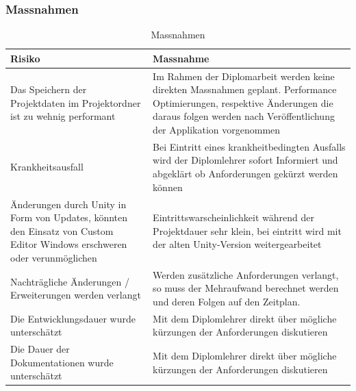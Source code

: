 \subsubsection{Massnahmen}
\begin{table}[H]
    \centering
    \settowidth{}
    \setlength\extrarowheight{2pt}
    \begin{tabulary}{1.0\textwidth}{|L|L|}
      \hline
      \textbf{Risiko} &
      \textbf{Massnahme}\\
      \hline
      Das Speichern der Projektdaten im Projektordner ist zu wehnig performant &
      Im Rahmen der Diplomarbeit werden keine direkten Massnahmen geplant.
      Performance Optimierungen, respektive Änderungen die daraus folgen werden nach Veröffentlichung der Applikation vorgenommen\\
      \hline
      Krankheitsausfall &
      Bei Eintritt eines krankheitbedingten Ausfalls wird der Diplomlehrer sofort Informiert und abgeklärt ob Anforderungen gekürzt werden können\\
      \hline
      Änderungen durch Unity in Form von Updates, könnten den Einsatz von Custom Editor Windows erschweren oder verunmöglichen &
      Eintrittswarscheinlichkeit während der Projektdauer sehr klein, bei eintritt wird mit der alten Unity-Version weitergearbeitet\\
      \hline
      Nachträgliche Änderungen / Erweiterungen werden verlangt &
      Werden zusätzliche Anforderungen verlangt, so muss der Mehraufwand berechnet werden und deren Folgen auf den Zeitplan.\\
      \hline
      Die Entwicklungsdauer wurde unterschätzt &
      Mit dem Diplomlehrer direkt über mögliche kürzungen der Anforderungen diskutieren\\
      \hline
      Die Dauer der Dokumentationen wurde unterschätzt &
      Mit dem Diplomlehrer direkt über mögliche kürzungen der Anforderungen diskutieren\\
      \hline
    \end{tabulary}
    \caption{Massnahmen}
  \end{table}
\newpage
